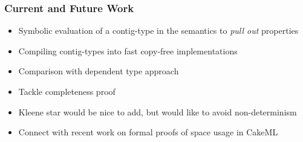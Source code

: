 \documentclass{beamer}
\begin{document}
\begin{frame}\frametitle{Current and  Future Work}

\begin{itemize}

\item Symbolic evaluation of a contig-type in the semantics to \emph{pull out} properties

\item Compiling contig-types into fast copy-free implementations

\item Comparison with dependent type approach

\item Tackle completeness proof

\item Kleene star would be nice to add, but would like to avoid non-determinism

\item Connect with recent work on formal proofs of space usage in CakeML

\end{itemize}

\end{frame}
\end{document}
